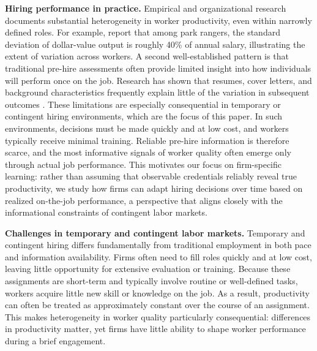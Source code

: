 \documentclass[opre,blindrev]{informs3}
\begin{document}
{\bf Hiring performance in practice.}
Empirical and organizational research documents substantial heterogeneity in worker productivity, even within narrowly defined roles. For example, \cite{schmidt1984selection} report that among park rangers, the standard deviation of dollar-value output is roughly 40\% of annual salary, illustrating the extent of variation across workers.
A second well-established pattern is that traditional pre-hire assessments often provide limited insight into how individuals will perform once on the job. 
Research has shown that %
resumes, cover letters, and background characteristics frequently explain little of the variation in subsequent outcomes \citep{gordon2006identifying, sackett2022revisiting, risavy2022resumes, murphy2009predictive}. 
These limitations are especially consequential in temporary or contingent hiring environments, which are the focus of this paper. In such environments, decisions must be made quickly and at low cost, and workers typically receive minimal training. Reliable pre-hire information is therefore scarce, and the most informative signals of worker quality often emerge only through actual job performance. This motivates our focus on firm-specific learning: rather than assuming that observable credentials reliably reveal true productivity, we study how firms can adapt hiring decisions over time based on realized on-the-job performance, a perspective that aligns closely with the informational constraints of contingent labor markets.

{\bf Challenges in temporary and contingent labor markets.}
Temporary and contingent hiring differs fundamentally from traditional employment in both pace and information availability. Firms often need to fill roles quickly and at low cost, leaving little opportunity for extensive evaluation or training. Because these assignments are short-term and typically involve routine or well-defined tasks, workers acquire little new skill or knowledge on the job. As a result, productivity can often be treated as approximately constant over the course of an assignment. This makes heterogeneity in worker quality particularly consequential: differences in productivity matter, yet firms have little ability to shape worker performance during a brief engagement.
\end{document}
